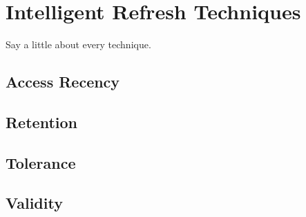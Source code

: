 \section{Intelligent Refresh Techniques} 
\label{sec:int}

Say a little about every technique.
\subsection{Access Recency}


\subsection{Retention}


\subsection{Tolerance}


\subsection{Validity}